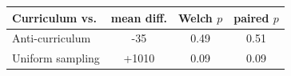 \begin{tabular}{lccc}
\toprule
Curriculum vs. & mean diff. & Welch $p$ & paired $p$ \\
\midrule
Anti-curriculum & -35 & 0.49 & 0.51 \\
Uniform sampling & +1010 & 0.09 & 0.09 \\
\bottomrule
\end{tabular}
